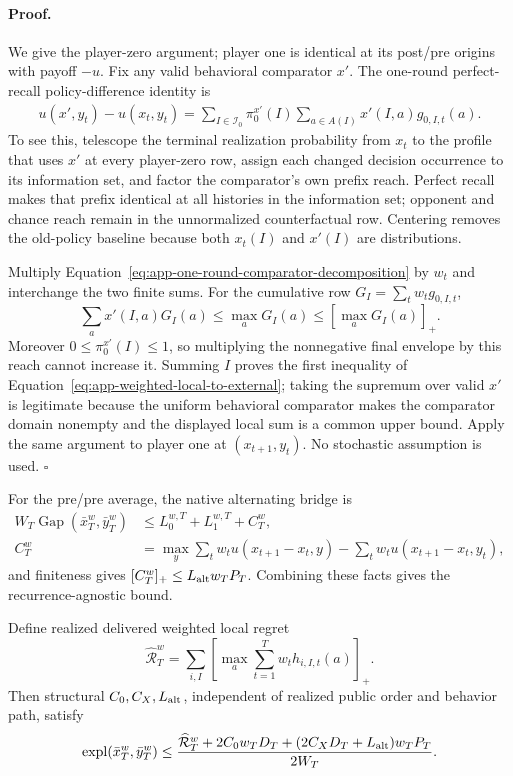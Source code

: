 \paragraph{Proof.}
We give the player-zero argument; player one is identical at its post/pre
origins with payoff $-u$.  Fix any valid behavioral comparator $x'$.  The
one-round perfect-recall policy-difference identity is
\begin{align}
u(x',y_t)-u(x_t,y_t)
=\sum_{I\in\mathcal I_0}\pi_0^{x'}(I)
 \sum_{a\in A(I)}x'(I,a)g_{0,I,t}(a).
\label{eq:app-one-round-comparator-decomposition}
\end{align}
To see this, telescope the terminal realization probability from $x_t$ to
the profile that uses $x'$ at every player-zero row, assign each changed
decision occurrence to its information set, and factor the comparator's own
prefix reach.  Perfect recall makes that prefix identical at all histories in
the information set; opponent and chance reach remain in the unnormalized
counterfactual row.  Centering removes the old-policy baseline because both
$x_t(I)$ and $x'(I)$ are distributions.

Multiply Equation~\ref{eq:app-one-round-comparator-decomposition} by $w_t$
and interchange the two finite sums.  For the cumulative row
$G_I=\sum_tw_tg_{0,I,t}$,
\[
\sum_a x'(I,a)G_I(a)\le\max_aG_I(a)
\le[\max_aG_I(a)]_+.
\]
Moreover $0\le\pi_0^{x'}(I)\le1$, so multiplying the nonnegative final
envelope by this reach cannot increase it.  Summing $I$ proves the first
inequality of Equation~\ref{eq:app-weighted-local-to-external}; taking the
supremum over valid $x'$ is legitimate because the uniform behavioral
comparator makes the comparator domain nonempty and the displayed local sum
is a common upper bound.  Apply the same argument
to player one at $(x_{t+1},y_t)$.  No stochastic assumption is used.
\hfill$\square$

For the pre/pre average, the native alternating bridge is
\begin{align}
 W_T\operatorname{Gap}(\bar x_T^w,\bar y_T^w)
 &\le L_0^{w,T}+L_1^{w,T}+C_T^w,\nonumber\\
 C_T^w
 &=\max_y\sum_t w_tu(x_{t+1}-x_t,y)
   -\sum_t w_tu(x_{t+1}-x_t,y_t),
\label{eq:app-weighted-alternating-bridge}
\end{align}
and finiteness gives $[C_T^w]_+\le L_{\rm alt}w_TP_T$.  Combining these
facts gives the recurrence-agnostic bound.

\begin{theorem}
\label{thm:app-weighted-master}
Define realized delivered weighted local regret
\[
\widehat{\mathcal R}_T^w
=\sum_{i,I}\left[\max_a\sum_{t=1}^Tw_th_{i,I,t}(a)\right]_+ .
\]
Then structural $C_0,C_X,L_{\rm alt}$, independent of realized public order
and behavior path, satisfy
\begin{equation}
\operatorname{expl}(\bar x_T^w,\bar y_T^w)
\le
\frac{\widehat{\mathcal R}_T^w+2C_0w_TD_T
+(2C_XD_T+L_{\rm alt})w_TP_T}{2W_T}.
\label{eq:app-weighted-master}
\end{equation}
\end{theorem}


